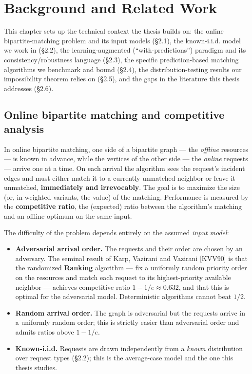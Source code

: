 \chapter{Background and Related Work}\label{background-and-related-work}

This chapter sets up the technical context the thesis builds on: the online
bipartite-matching problem and its input models (§2.1), the known-i.i.d. model we work in
(§2.2), the learning-augmented (``with-predictions'') paradigm and its
consistency/robustness language (§2.3), the specific prediction-based matching algorithms
we benchmark and bound (§2.4), the distribution-testing results our impossibility theorem
relies on (§2.5), and the gaps in the literature this thesis addresses (§2.6).

\section{Online bipartite matching and competitive analysis}\label{online-bipartite-matching-and-competitive-analysis}

In online bipartite matching, one side of a bipartite graph --- the \emph{offline} resources --- is
known in advance, while the vertices of the other side --- the \emph{online} requests --- arrive one
at a time. On each arrival the algorithm sees the request's incident edges and must
either match it to a currently unmatched neighbor or leave it unmatched, \textbf{immediately and
irrevocably}. The goal is to maximize the size (or, in weighted variants, the value) of
the matching. Performance is measured by the \textbf{competitive ratio}, the (expected) ratio
between the algorithm's matching and an offline optimum on the same input.

The difficulty of the problem depends entirely on the assumed \emph{input model}:

\begin{itemize}
\tightlist
\item
  \textbf{Adversarial arrival order.} The requests and their order are chosen by an adversary.
  The seminal result of Karp, Vazirani and Vazirani {[}KVV90{]} is that the randomized
  \textbf{Ranking} algorithm --- fix a uniformly random priority order on the resources and match
  each request to its highest-priority available neighbor --- achieves competitive ratio
  \(1-1/e\approx0.632\), and that this is optimal for the adversarial model. Deterministic
  algorithms cannot beat \(1/2\).
\item
  \textbf{Random arrival order.} The graph is adversarial but the requests arrive in a uniformly
  random order; this is strictly easier than adversarial order and admits ratios above
  \(1-1/e\).
\item
  \textbf{Known-i.i.d.} Requests are drawn independently from a \emph{known} distribution over request
  types (§2.2); this is the average-case model and the one this thesis studies.
\end{itemize}

